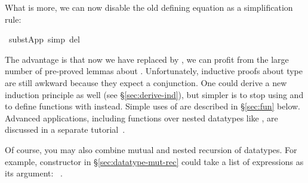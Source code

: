 \begin{isabellebody}
\isamarkupfalse%
%
\endisatagproof
{\isafoldproof}%
%
\isadelimproof
%
\endisadelimproof
%
\begin{isamarkuptext}%
\noindent
What is more, we can now disable the old defining equation as a
simplification rule:%
\end{isamarkuptext}%
\isamarkuptrue%
\isamarkupfalse%
\ subst{}App\ {}simp\ del{}%
\begin{isamarkuptext}%
\noindent The advantage is that now we have replaced  by , we can profit from the large number of
pre-proved lemmas about .  Unfortunately, inductive proofs
about type  are still awkward because they expect a
conjunction. One could derive a new induction principle as well (see
\S\ref{sec:derive-ind}), but simpler is to stop using
 and to define functions with 
instead.  Simple uses of  are described in
\S\ref{sec:fun} below.  Advanced applications, including functions
over nested datatypes like , are discussed in a
separate tutorial~\cite{isabelle-function}.

Of course, you may also combine mutual and nested recursion of datatypes. For example,
constructor  in \S\ref{sec:datatype-mut-rec} could take a list of
expressions as its argument: ~.%
\end{isamarkuptext}%
\isamarkuptrue%
%
\isadelimtheory
%
\endisadelimtheory
%
\isatagtheory
%
\endisatagtheory
{\isafoldtheory}%
%
\isadelimtheory
%
\endisadelimtheory
\end{isabellebody}%
